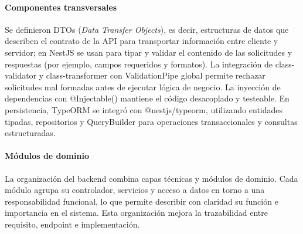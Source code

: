   \paragraph{Componentes transversales}
  Se definieron DTOs (\textit{Data Transfer Objects}), es decir, estructuras de datos que describen el contrato de la API para transportar información entre cliente y servidor; en NestJS se usan para tipar y validar el contenido de las solicitudes y respuestas (por ejemplo, campos requeridos y formatos). La integración de class-validator y class-transformer con ValidationPipe global permite rechazar solicitudes mal formadas antes de ejecutar lógica de negocio. La inyección de dependencias con @Injectable() mantiene el código desacoplado y testeable. En persistencia, TypeORM se integró con @nestjs/typeorm, utilizando entidades tipadas, repositorios y QueryBuilder para operaciones transaccionales y consultas estructuradas.

  \paragraph{Módulos de dominio}
  La organización del backend combina capas técnicas y módulos de dominio. Cada módulo agrupa su controlador, servicios y acceso a datos en torno a una responsabilidad funcional, lo que permite describir con claridad su función e importancia en el sistema. Esta organización mejora la trazabilidad entre requisito, endpoint e implementación.

